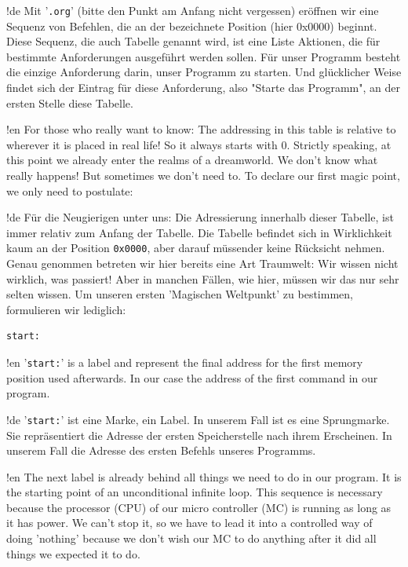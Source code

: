 !de Mit '\texttt{.org}' (bitte den Punkt am Anfang nicht vergessen) eröffnen wir eine Sequenz von Befehlen, die an der bezeichnete Position (hier 0x0000) beginnt. Diese Sequenz, die auch Tabelle genannt wird, ist eine Liste Aktionen, die für bestimmte Anforderungen ausgeführt werden sollen. Für unser Programm besteht die einzige Anforderung darin, unser Programm zu starten. Und glücklicher Weise findet sich der Eintrag für diese Anforderung, also "Starte das Programm", an der ersten Stelle diese Tabelle.



!en For those who really want to know: The addressing in this table is relative to wherever it is placed in real life! So it always starts with 0. Strictly speaking, at this point we already enter the realms of a dreamworld. We don't know what really happens! But sometimes we don't need to. To declare our first magic point, we only need to postulate:

!de Für die Neugierigen unter uns: Die Adressierung innerhalb dieser Tabelle, ist immer relativ zum Anfang der Tabelle. Die Tabelle befindet sich in Wirklichkeit kaum an der Position \texttt{0x0000}, aber darauf müssender keine Rücksicht nehmen. Genau genommen betreten wir hier bereits eine Art Traumwelt: Wir wissen nicht wirklich, was passiert! Aber in manchen Fällen, wie hier, müssen wir das nur sehr selten wissen. Um unseren ersten 'Magischen Weltpunkt' zu bestimmen, formulieren wir lediglich:

\begin{lstlisting}
start:
\end{lstlisting}



!en '\texttt{start:}' is a label and represent the final address for the first memory position used afterwards. In our case the address of the first command in our program.

!de '\texttt{start:}' ist eine Marke, ein Label. In unserem Fall ist es eine Sprungmarke. Sie repräsentiert die Adresse der ersten Speicherstelle nach ihrem Erscheinen. In unserem Fall die Adresse des ersten Befehls unseres Programms.



!en The next label is already behind all things we need to do in our program. It is the starting point of an unconditional infinite loop. This sequence is necessary because the processor (CPU) of our micro controller (MC) is running as long as it has power. We can't stop it, so we have to lead it into a controlled way of doing 'nothing' because we don't wish our MC to do anything after it did all things we expected it to do.

